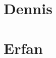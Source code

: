 \documentclass[onecolumn,twoside]{IEEEtran}
\begin{document}




\section{Dennis}

\section{Erfan}



\end{document}
